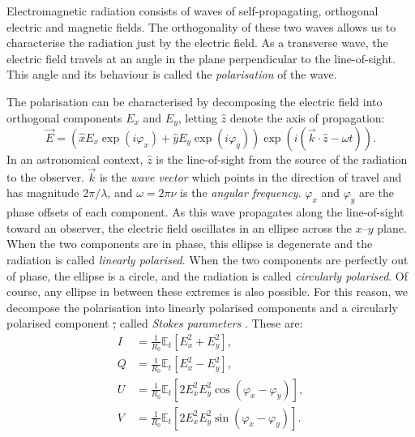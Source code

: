 \documentclass[11pt, a4paper]{book}
\newcommand{\defn}[1]{\emph{#1}}
\providecommand{\DIFdeltex}[1]{{\protect\color{red}\sout{#1}}}                      %
\providecommand{\DIFdelbegin}{} %
\providecommand{\DIFdelend}{} %
\providecommand{\DIFdel}[1]{\texorpdfstring{\DIFdeltex{#1}}{}} %
\newcommand{\DIFscaledelfig}{0.5}
\newlength{\DIFdelgraphicswidth} %
\newlength{\DIFdelgraphicsheight} %
\newcommand{\DIFdelincludegraphics}[2][]{%
\sbox{\DIFdelgraphicsbox}{\DIFOincludegraphics[#1]{#2}}%
\settoboxwidth{\DIFdelgraphicswidth}{\DIFdelgraphicsbox} %
\settoboxtotalheight{\DIFdelgraphicsheight}{\DIFdelgraphicsbox} %
\scalebox{\DIFscaledelfig}{%
\parbox[b]{\DIFdelgraphicswidth}{\usebox{\DIFdelgraphicsbox}\\[-\baselineskip] \rule{\DIFdelgraphicswidth}{0em}}\llap{\resizebox{\DIFdelgraphicswidth}{\DIFdelgraphicsheight}{%
\setlength{\unitlength}{\DIFdelgraphicswidth}%
\begin{picture}(1,1)%
\thicklines\linethickness{2pt} %
{\color[rgb]{1,0,0}\put(0,0){\framebox(1,1){}}}%
{\color[rgb]{1,0,0}\put(0,0){\line( 1,1){1}}}%
{\color[rgb]{1,0,0}\put(0,1){\line(1,-1){1}}}%
\end{picture}%
}\hspace*{3pt}}} %
} %
\DeclareRobustCommand{\DIFdelbegin}{\DIFOdelbegin \let\includegraphics\DIFdelincludegraphics} %
\DeclareRobustCommand{\DIFdelend}{\DIFOaddend \let\includegraphics\DIFOincludegraphics} %
\begin{document}
        Electromagnetic radiation consists of waves of self-propagating, orthogonal electric and magnetic fields. The orthogonality of these two waves allows us to characterise the radiation just by the electric field. As a transverse wave, the electric field travels at an angle in the plane perpendicular to the line-of-sight. This angle and its behaviour is called the \defn{polarisation} of the wave.

        The polarisation can be characterised by decomposing the electric field into orthogonal components $E_x$ and $E_y$, letting $\hat z$ denote the axis of propagation:
        \begin{equation}
            \vec E = (\hat x E_x \exp(i \varphi_x) + \hat y E_y \exp(i \varphi_y)) \exp(i (\vec k \cdot \hat z - \omega t)).
        \end{equation}
        In an astronomical context, $\hat z$ is the line-of-sight from the source of the radiation to the observer. $\vec k$ is the \defn{wave vector} which points in the direction of travel and has magnitude $2\pi/\lambda$, and $\omega = 2\pi\nu$ is the \defn{angular frequency}. $\varphi_x$ and $\varphi_y$ are the phase offsets of each component. As this wave propagates along the line-of-sight toward an observer, the electric field oscillates in an ellipse across the $x$--$y$ plane. When the two components are in phase, this ellipse is degenerate and the radiation is called \defn{linearly polarised}. When the two components are perfectly out of phase, the ellipse is a circle, and the radiation is called \defn{circularly polarised}. Of course, any ellipse in between these extremes is also possible. For this reason, we decompose the polarisation into linearly polarised components and a circularly polarised component \DIFdelbegin \DIFdel{, }\DIFdelend called \defn{Stokes parameters} \citep{stokes_composition_1851,condon_essential_2016}. These are:
        \begin{align}
            \label{eq:stokes-i}
            I &= \frac{1}{R_0} \mathbb E_t[E_x^2 + E_y^2],\\
            \label{eq:stokes-q}
            Q &= \frac{1}{R_0} \mathbb E_t[E_x^2 - E_y^2],\\
            \label{eq:stokes-u}
            U &= \frac{1}{R_0} \mathbb E_t[2 E_x^2 E_y^2 \cos (\varphi_x - \varphi_y)],\\
            \label{eq:stokes-v}
            V &= \frac{1}{R_0} \mathbb E_t[2 E_x^2 E_y^2 \sin (\varphi_x - \varphi_y)].
        \end{align}
\end{document}
